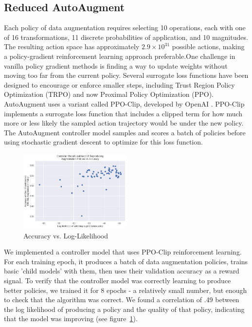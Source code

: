\documentclass[10pt,twocolumn,letterpaper]{article}
\begin{document}
\subsection{Reduced AutoAugment}
Each policy of data augmentation requires selecting 10 operations, each with one of 16 transformations, 11 discrete probabilities of application, and 10 magnitudes.  The resulting action space has approximately $2.9 \times 10^{31}$ possible actions, making a policy-gradient reinforcement learning approach preferable.One challenge in vanilla policy gradient methods is finding a way to update weights without moving too far from the current policy. Several surrogate loss functions have been designed to encourage or enforce smaller steps, including Trust Region Policy Optimization (TRPO) and now Proximal Policy Optimization (PPO). AutoAugment uses a variant called PPO-Clip, developed by OpenAI \cite{Schulman2017}. PPO-Clip implements a surrogate loss function that includes a clipped term for how much more or less likely the sampled action trajectory would be under the new policy. The AutoAugment controller model samples and scores a batch of policies before using stochastic gradient descent to optimize for this loss function.

\begin{figure}[h]		
\begin{center}
\includegraphics[width=0.5\textwidth]{ReducedAutoAugment.png}
\end{center}
\caption{Accuracy vs. Log-Likelihood}
\label{fig:RAA}
\end{figure}
		We implemented a controller model that uses PPO-Clip reinforcement learning. For each training epoch, it produces a batch of data augmentation policies, trains basic 'child models' with them, then uses their validation accuracy as a reward signal. To verify that the controller model was correctly learning to produce better policies, we trained it for 8 epochs - a relatively small number, but enough to check that the algorithm was correct. We found a correlation of .49 between the log likelihood of producing a policy and the quality of that policy, indicating that the model was improving (see figure~\ref{fig:RAA}).
\end{document}
